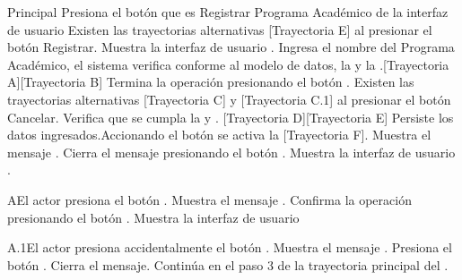 \begin{UCtrayectoria}{Principal}
    \UCpaso[\UCactor] Presiona el botón \IUbutton{(+)} que es Registrar Programa Académico de la interfaz de usuario Existen las trayectorias alternativas [Trayectoria E] al presionar el botón Registrar.
    \UCpaso Muestra la interfaz de usuario .
    \UCpaso[\UCactor] Ingresa el nombre del Programa Académico, el sistema verifica conforme al modelo de datos, la  y la .[Trayectoria A][Trayectoria B]
    \UCpaso[\UCactor] Termina la operación presionando el botón . Existen las trayectorias alternativas [Trayectoria C] y [Trayectoria C.1] al presionar el botón Cancelar.
    \UCpaso Verifica que se cumpla la  y . [Trayectoria D][Trayectoria E]
    \UCpaso Persiste los datos ingresados.Accionando el botón  se activa la  [Trayectoria F].
    \UCpaso Muestra el mensaje .
    \UCpaso[\UCactor] Cierra el mensaje presionando el botón .
    \UCpaso Muestra la interfaz de usuario .
\end{UCtrayectoria}
\begin{UCtrayectoriaA}{A}{El actor presiona el botón .}
    \UCpaso Muestra el mensaje .
    \UCpaso[\UCactor] Confirma la operación presionando el botón .
    \UCpaso Muestra la interfaz de usuario 
\end{UCtrayectoriaA}

\begin{UCtrayectoriaA}{A.1}{El actor presiona accidentalmente el botón .}
    \UCpaso Muestra el mensaje .
    \UCpaso[\UCactor] Presiona el botón .
    \UCpaso Cierra el mensaje.
    \UCpaso Continúa en el paso 3 de la trayectoria principal del .
\end{UCtrayectoriaA}

